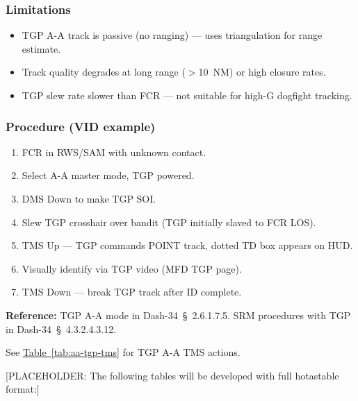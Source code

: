 \documentclass[11pt, a4paper, twoside]{report}
\newenvironment{hotastable}[1]{%
	\footnotesize
	\setlength{\tabcolsep}{3pt}
	\renewcommand{\arraystretch}{1.35}
	\begin{longtable}{L{1.00cm} L{0.90cm} L{0.90cm} L{3.30cm} L{6.40cm} L{1.40cm} L{1.60cm}}
		\caption{#1}\label{table.\thetable}\\
		\noalign{\addtocontents{hotas}{\protect\contentsline{table}{\protect\numberline{\thetable}#1}{\thepage}{table.\thetable}}}%
		\rowcolor{headerblue}
		\multicolumn{1}{>{\centering\arraybackslash}p{1.00cm}}{\textbf{\color{white}Mode}} &
		\multicolumn{1}{>{\centering\arraybackslash}p{0.90cm}}{\textbf{\color{white}Dir.}} &
		\multicolumn{1}{>{\centering\arraybackslash}p{0.90cm}}{\textbf{\color{white}Act.}} &
		\multicolumn{1}{>{\centering\arraybackslash}p{3.30cm}}{\textbf{\color{white}Function}} &
		\multicolumn{1}{>{\centering\arraybackslash}p{6.40cm}}{\textbf{\color{white}Effect / Nuance}} &
		\multicolumn{1}{>{\centering\arraybackslash}p{1.40cm}}{\textbf{\color{white}Dash34}} &
		\multicolumn{1}{>{\centering\arraybackslash}p{1.60cm}}{\textbf{\color{white}Train.}} \\
		\endfirsthead
		\rowcolor{headerblue}
		\multicolumn{1}{>{\centering\arraybackslash}p{1.00cm}}{\textbf{\color{white}Mode}} &
		\multicolumn{1}{>{\centering\arraybackslash}p{0.90cm}}{\textbf{\color{white}Dir.}} &
		\multicolumn{1}{>{\centering\arraybackslash}p{0.90cm}}{\textbf{\color{white}Act.}} &
		\multicolumn{1}{>{\centering\arraybackslash}p{3.30cm}}{\textbf{\color{white}Function}} &
		\multicolumn{1}{>{\centering\arraybackslash}p{6.40cm}}{\textbf{\color{white}Effect / Nuance}} &
		\multicolumn{1}{>{\centering\arraybackslash}p{1.40cm}}{\textbf{\color{white}Dash34}} &
		\multicolumn{1}{>{\centering\arraybackslash}p{1.60cm}}{\textbf{\color{white}Train.}} \\
		\endhead
		\multicolumn{7}{r}{\small\emph{Continued on next page}}\\
		\endfoot
		\endlastfoot
	}{%
	\end{longtable}
}
\newcommand{\dashref}[1]{Dash-34~\S~#1}
\newcommand{\tabref}[1]{\hyperref[#1]{Table~\ref*{#1}}}
\begin{document}
\subsubsection*{Limitations}
\label{sec:C4-S3-S6-S4}

\begin{itemize}[nosep]
    \item TGP A-A track is passive (no ranging) --- uses triangulation for range estimate.
    \item Track quality degrades at long range ($>$10~NM) or high closure rates.
    \item TGP slew rate slower than FCR --- not suitable for high-G dogfight tracking.
\end{itemize}

\subsubsection*{Procedure (VID example)}
\label{sec:C4-S3-S6-S5}

\begin{enumerate}[nosep]
    \item FCR in RWS/SAM with unknown contact.
    \item Select A-A master mode, TGP powered.
    \item DMS Down to make TGP SOI.
    \item Slew TGP crosshair over bandit (TGP initially slaved to FCR LOS).
    \item TMS Up --- TGP commands POINT track, dotted TD box appears on HUD.
    \item Visually identify via TGP video (MFD TGP page).
    \item TMS Down --- break TGP track after ID complete.
\end{enumerate}

\textbf{Reference:} TGP A-A mode in \dashref{2.6.1.7.5}. SRM procedures 
with TGP in \dashref{4.3.2.4.3.12}.

See \tabref{tab:aa-tgp-tms} for TGP A-A TMS actions.


[PLACEHOLDER: The following tables will be developed with full hotastable format:]

\end{document}
